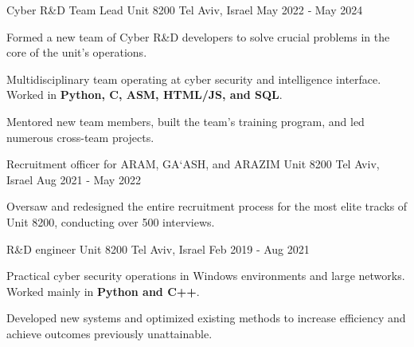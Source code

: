
\begin{cventries}

  \cventry
    {Cyber R\&D Team Lead} %
    {Unit 8200} %
    {Tel Aviv, Israel} %
    {May 2022 ‑ May 2024} %
    {
      \begin{cvitems} %
        \item {Formed a new team of Cyber R\&D developers to solve crucial problems in the core of the unit’s operations.}
        \item {Multidisciplinary team operating at cyber security and intelligence interface. Worked in \textbf{Python, C, ASM, HTML/JS, and SQL}.}
        \item {Mentored new team members, built the team's training program, and led numerous cross-team projects.}
      \end{cvitems}
    }
  
  \cventry
    {Recruitment officer for ARAM, GA‘ASH, and ARAZIM} %
    {Unit 8200} %
    {Tel Aviv, Israel} %
    {Aug 2021 ‑ May 2022} %
    {
      \begin{cvitems} %
        \item {Oversaw and redesigned the entire recruitment process for the most elite tracks of Unit 8200, conducting over 500 interviews.}
      \end{cvitems}
    }
    
  \cventry
    {R\&D engineer} %
    {Unit 8200} %
    {Tel Aviv, Israel} %
    {Feb 2019 ‑ Aug 2021} %
    {
      \begin{cvitems} %
      \item{Practical cyber security operations in Windows environments and large networks. Worked mainly in \textbf{Python and C++}.}
      \item{Developed new systems and optimized existing methods to increase efficiency and achieve outcomes previously unattainable.}
      \end{cvitems}
    }
    
\end{cventries}
